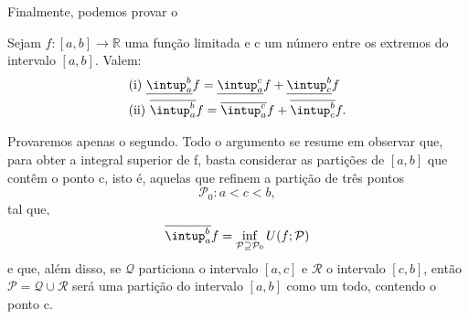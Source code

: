 \documentclass[../analysisII_notes.tex]{subfiles}
\begin{document}
Finalmente, podemos provar o
\hypertarget{integral_additivity}{\begin{theorem*}
		Sejam \(f:[a, b]\rightarrow \mathbb{R}\) uma função limitada e c um número entre os extremos do intervalo \([a, b]\). Valem:
		\begin{align*}
			 & \text{(i) } \underline{\intup_{a}^{b}}f = \underline{\intup_{a}^{c}}f + \underline{\intup_{c}^{b}}f \\
			 & \text{(ii) } \overline{\intup_{a}^{b}}f = \overline{\intup_{a}^{c}}f + \overline{\intup_{c}^{b}}f.
		\end{align*}
	\end{theorem*}}
\begin{proof*}
	Provaremos apenas o segundo. Todo o argumento se resume em observar que, para obter a integral superior de f, basta considerar as partições de \([a, b]\) que contêm o ponto c, isto é, aquelas que refinem a partição de três pontos
	\[
		\mathcal{P}_{0}: a < c < b,
	\]
	tal que,
	\[
		\overline{\intup_{a}^{b}}f = \inf_{\mathcal{P}\supseteq \mathcal{P}_{0}}U(f; \mathcal{P})
	\]
	e que, além disso, se \(\mathcal{Q}\) particiona o intervalo \([a, c]\) e \(\mathcal{R}\) o intervalo \([c, b]\), então \(\mathcal{P}=\mathcal{Q}\cup \mathcal{R}\) será uma partição do intervalo \([a, b]\) como um todo, contendo o ponto c.


\end{proof*}
\end{document}
